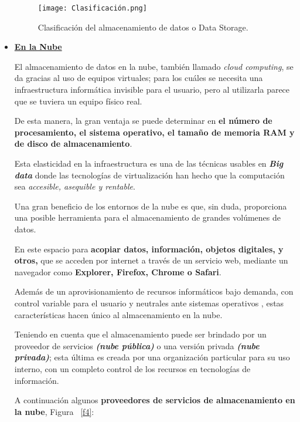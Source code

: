\documentclass[10pt,journal]{IEEEtran}
\begin{document}
\begin{itemize}
    \begin{figure}[H]
        \begin{center}
            \texttt{[image: Clasificación.png]}
            \caption{Clasificación del almacenamiento de datos o Data Storage.}
            \label{f1} 
        \end{center}
    \end{figure}
    
    \item \underline{\textbf{En la Nube}}
    
    El almacenamiento de datos en la nube, también llamado \textit{cloud computing}, se da gracias al uso de equipos virtuales; para los cuáles se necesita una infraestructura informática invisible para el usuario, pero al utilizarla parece que se tuviera un equipo físico real.
    
    De esta manera, la gran ventaja se puede determinar en \textbf{el número de procesamiento, el sistema operativo, el tamaño de memoria RAM y de disco de almacenamiento}.
    
    Esta elasticidad en la infraestructura es una de las técnicas usables en \textit{\textbf{Big data}} donde las tecnologías de virtualización han hecho que la computación sea \textit{accesible, asequible y rentable}.
    
    Una gran beneficio de los entornos de la nube es que, sin duda, proporciona una posible herramienta para el almacenamiento de grandes volúmenes de datos.
    
    En este espacio para \textbf{acopiar datos, información, objetos digitales, y otros,} que se acceden por internet a través de un servicio web, mediante un navegador como \textbf{Explorer, Firefox, Chrome o Safari}.
    
    Además de un aprovisionamiento de recursos informáticos bajo demanda, con control variable para el usuario y neutrales ante sistemas operativos \cite{vazquez2015tecnologias}, estas características hacen único al almacenamiento en la nube.
    
    Teniendo en cuenta que el almacenamiento puede ser brindado por un proveedor de servicios \textit{\textbf{(nube pública)}} o una versión privada \textit{\textbf{(nube privada)}}; esta última es creada por una organización particular para su uso interno, con un completo control de los recursos en tecnologías de información.
    
    A continuación algunos \textbf{proveedores de servicios de almacenamiento en la nube}, Figura ~\ref{f4}:
    

\end{itemize}
\end{document}
